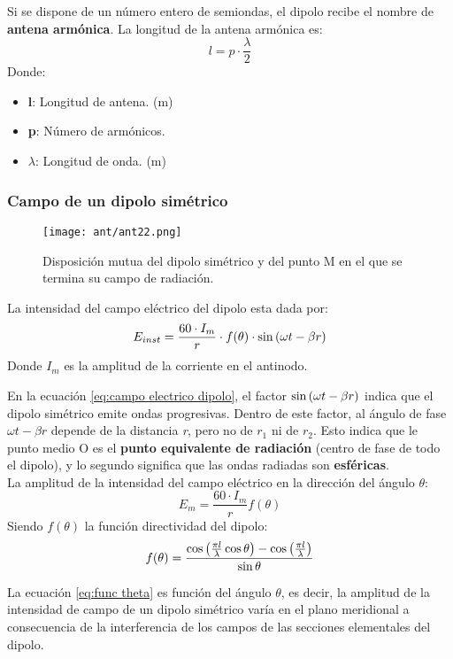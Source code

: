 \documentclass[
	12pt, %
	fleqn, %
	a4paper, %
	oneside, %
]{LegrandOrangeBook}
\begin{document}
\begin{definition}
Si se dispone de un número entero de semiondas, el dipolo recibe el nombre de \textbf{antena armónica}. La longitud de la antena armónica es:
\begin{equation}
l=p\cdot \frac{\lambda}{2}
\label{eq:long ant armo}
\end{equation}
Donde:
\begin{itemize}
\item \textbf{l}: Longitud de antena. (m)
\item \textbf{p}: Número de armónicos.
\item $\lambda$: Longitud de onda. (m)
\end{itemize}
\end{definition}
\subsubsection{Campo de un dipolo simétrico}
\begin{figure}[H]
\centering
\texttt{[image: ant/ant22.png]}
\caption{Disposición mutua del dipolo simétrico y del punto M en el que se termina su campo de radiación.}
\end{figure}
\begin{definition}
La intensidad del campo eléctrico del dipolo esta dada por:
\begin{equation}
E_{inst}=\frac{60\cdot I_m}{r}\cdot f(\theta)\cdot\sin\left(\omega t-\beta r\right)
\label{eq:campo electrico dipolo}
\end{equation}
Donde $I_m$ es la amplitud de la corriente en el antinodo.
\end{definition}
En la ecuación \ref{eq:campo electrico dipolo}, el factor $\sin\left(\omega t-\beta r\right)$ indica que el dipolo simétrico emite ondas progresivas. Dentro de este factor, al ángulo de fase $\omega t-\beta r$ depende de la distancia \textit{r}, pero no de $r_1$ ni de $r_2$. Esto indica que le punto medio O es el \textbf{punto equivalente de radiación} (centro de fase de todo el dipolo), y lo segundo significa que las ondas radiadas son \textbf{esféricas}.\\
La amplitud de la intensidad del campo eléctrico en la dirección del ángulo $\theta$:
\begin{equation}
E_m=\frac{60\cdot I_m}{r}f(\theta)
\end{equation}
Siendo $f(\theta)$ la función directividad del dipolo:
\begin{equation}
f(\theta)=\frac{\cos\left(\frac{\pi l}{\lambda}\cos\theta\right)-\cos\left(\frac{\pi l}{\lambda}\right)}{\sin\theta}
\label{eq:func theta}
\end{equation}
\begin{corollary}
La ecuación \ref{eq:func theta} es función del ángulo $\theta$, es decir, la amplitud de la intensidad de campo de un dipolo simétrico varía en el plano meridional a consecuencia de la interferencia de los campos de las secciones elementales del dipolo.
\end{corollary}
\end{document}
